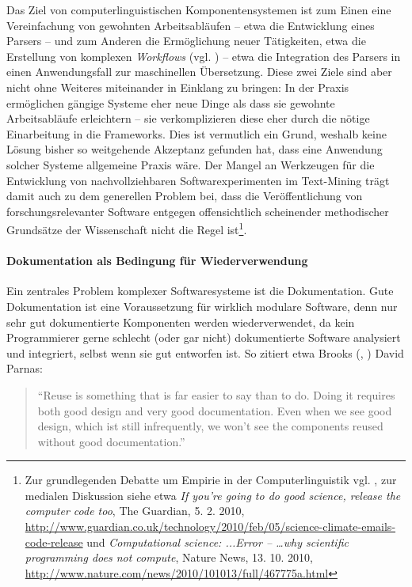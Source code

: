 \documentclass[abstracton, 12pt]{scrartcl}
\begin{document}
Das Ziel von computerlinguistischen Komponentensystemen ist zum Einen eine Vereinfachung von gewohnten Arbeitsabläufen -- etwa die Entwicklung eines Parsers -- und zum Anderen die Ermöglichung neuer Tätigkeiten, etwa die Erstellung von komplexen \emph{Workflows} (vgl. \citealt{BirdAndLiberman1999}) -- etwa die Integration des Parsers in einen Anwendungsfall zur maschinellen Übersetzung. Diese zwei Ziele sind aber nicht ohne Weiteres miteinander in Einklang zu bringen: In der Praxis ermöglichen gängige Systeme eher neue Dinge als dass sie gewohnte Arbeitsabläufe erleichtern -- sie verkomplizieren diese eher durch die nötige Einarbeitung in die Frameworks. Dies ist vermutlich ein Grund, weshalb keine Lösung bisher so weitgehende Akzeptanz gefunden hat, dass eine Anwendung solcher Systeme allgemeine Praxis wäre. Der Mangel an Werkzeugen für die Entwicklung von nachvollziehbaren Softwarexperimenten im Text-Mining trägt damit auch zu dem generellen Problem bei, dass die Veröffentlichung von forschungsrelevanter Software entgegen offensichtlich scheinender methodischer Grundsätze der Wissenschaft nicht die Regel ist\footnote{Zur grundlegenden Debatte um Empirie in der Computerlinguistik vgl. \citet{Pedersen2008b}, zur medialen Diskussion siehe etwa \emph{If you're going to do good science, release the computer code too},  The Guardian, 5. 2. 2010, \url{http://www.guardian.co.uk/technology/2010/feb/05/science-climate-emails-code-release} und \emph{Computational science: ...Error -- …why scientific programming does not compute},  Nature News, 13. 10. 2010, \url{http://www.nature.com/news/2010/101013/full/467775a.html}}.

\paragraph{Dokumentation als Bedingung für Wiederverwendung}

Ein zentrales Problem komplexer Softwaresysteme ist die Dokumentation. Gute Dokumentation ist eine Voraussetzung für wirklich modulare Software, denn nur sehr gut dokumentierte Komponenten werden wiederverwendet, da kein Programmierer gerne schlecht (oder gar nicht) dokumentierte Software analysiert und integriert, selbst wenn sie gut entworfen ist. So zitiert etwa Brooks (\citealt{Brooks1975}, \citealt[224]{Brooks1995}) David Parnas: 

\begin{quote}
``Reuse is something that is far easier to say than to do. Doing it requires both good design and very good documentation. Even when we see good design, which ist still infrequently, we won't see the components reused without good documentation.''
\end{quote}
\end{document}
